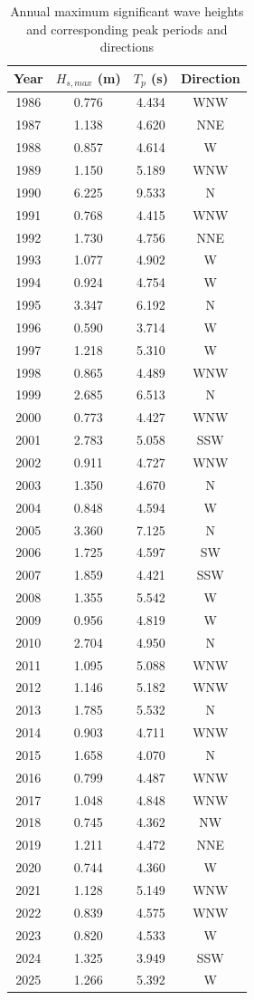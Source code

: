 \documentclass[a4paper, 11pt]{article}
\begin{document}
\begin{table}[H]
\centering
\caption{Annual maximum significant wave heights and corresponding peak periods and directions}
\label{tab:wind}
\begin{tabular}{cccc}
\hline
Year & $H_{s,max}$ (m) & $T_{p}$ (s) & Direction \\
\hline
1986 & 0.776 & 4.434 & WNW \\
1987 & 1.138 & 4.620 & NNE \\
1988 & 0.857 & 4.614 & W \\
1989 & 1.150 & 5.189 & WNW \\
1990 & 6.225 & 9.533 & N \\
1991 & 0.768 & 4.415 & WNW \\
1992 & 1.730 & 4.756 & NNE \\
1993 & 1.077 & 4.902 & W \\
1994 & 0.924 & 4.754 & W \\
1995 & 3.347 & 6.192 & N \\
1996 & 0.590 & 3.714 & W \\
1997 & 1.218 & 5.310 & W \\
1998 & 0.865 & 4.489 & WNW \\
1999 & 2.685 & 6.513 & N \\
2000 & 0.773 & 4.427 & WNW \\
2001 & 2.783 & 5.058 & SSW \\
2002 & 0.911 & 4.727 & WNW \\
2003 & 1.350 & 4.670 & N \\
2004 & 0.848 & 4.594 & W \\
2005 & 3.360 & 7.125 & N \\
2006 & 1.725 & 4.597 & SW \\
2007 & 1.859 & 4.421 & SSW \\
2008 & 1.355 & 5.542 & W \\
2009 & 0.956 & 4.819 & W \\
2010 & 2.704 & 4.950 & N \\
2011 & 1.095 & 5.088 & WNW \\
2012 & 1.146 & 5.182 & WNW \\
2013 & 1.785 & 5.532 & N \\
2014 & 0.903 & 4.711 & WNW \\
2015 & 1.658 & 4.070 & N \\
2016 & 0.799 & 4.487 & WNW \\
2017 & 1.048 & 4.848 & WNW \\
2018 & 0.745 & 4.362 & NW \\
2019 & 1.211 & 4.472 & NNE \\
2020 & 0.744 & 4.360 & W \\
2021 & 1.128 & 5.149 & WNW \\
2022 & 0.839 & 4.575 & WNW \\
2023 & 0.820 & 4.533 & W \\
2024 & 1.325 & 3.949 & SSW \\
2025 & 1.266 & 5.392 & W \\
\hline
\end{tabular}
\end{table}
\end{document}
